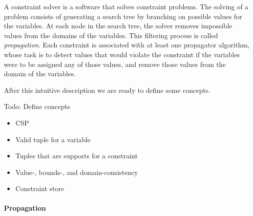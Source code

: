 \documentclass[a4paper,11pt]{article}
\newtheorem{definition}{Definition}
\newcommand{\Todo}[1]{{\color{blue}#1}}
\numberwithin{equation}{section}
\begin{document}
A constraint solver is a software that solves constraint problems.
The solving of a problem consists of generating a search tree by branching
on possible values for the variables. At each node in the search tree,
the solver removes impossible values from the domains of the variables.
This filtering process is called \emph{propagation}. Each constraint is
associated with at least one propagator algorithm, whose task is to detect
values that would violate the constraint if the variables were to be assigned
any of those values, and remove those values from the domain of the variables.

After this intuitive description we are ready to define some concepts.


% 

\Todo{Todo: Define concepts
\begin{itemize}
  \item CSP
  \item Valid tuple for a variable
  \item Tuples that are supports for a constraint
  \item Value-, bounds-, and domain-consistency
  \item Constraint store
\end{itemize}
}

\paragraph{Propagation}


\end{document}

